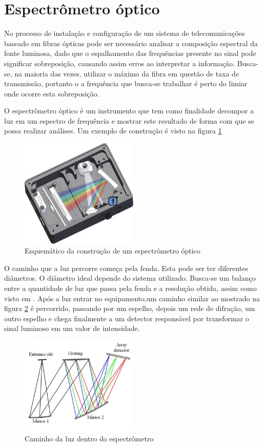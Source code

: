 \documentclass[article]{IEEEtran}
\begin{document}
\section{Espectrômetro óptico}
No processo de instalação e configuração de um sistema de telecomunicações baseado em fibras ópticas pode ser necessário analisar a composição espectral da fonte luminosa, dado que o espalhamento das frequências presente no sinal pode significar sobreposição, causando assim erros ao interpretar a informação. Busca-se, na maioria das vezes, utilizar o máximo da fibra em questão de taxa de transmissão, portanto o a frequência que busca-se trabalhar é perto do limiar onde ocorre esta sobreposição.
 
O espectrômetro óptico é um instrumento que tem como finalidade decompor a luz em um espectro de frequência e mostrar este resultado de forma com que se possa realizar análises. Um exemplo de construção é visto na figura \ref{fig:espectrometro_esquematico}

\begin{figure}[H]
	\includegraphics[width=0.5\textwidth]{images/esquematico_espectrometro.jpeg}
	\caption{Esquemático da construção de um espectrômetro óptico}
	\label{fig:espectrometro_esquematico}
\end{figure} 

O caminho que a luz percorre começa pela fenda. Esta pode ser ter diferentes diâmetros. O diâmetro ideal depende do sistema utilizado. Busca-se um balanço entre a quantidade de luz que passa pela fenda e a resolução obtida, assim como visto em \cite{SPECTROMETES}. Após a luz entrar no equipamento,um caminho similar ao mostrado na figura \ref{fig:caminho_luz} é percorrido, passando por um espelho, depois um rede de difração, um outro espelho e chega finalmente a um detector responsável por transformar o sinal luminoso em um valor de intensidade.

\begin{figure}[H]
	\includegraphics[width=0.5\textwidth, height=0.35\textwidth]{images/caminho_luz.jpg}
	\caption{Caminho da luz dentro do espectrômetro}
	\label{fig:caminho_luz}
\end{figure}  
\end{document}
